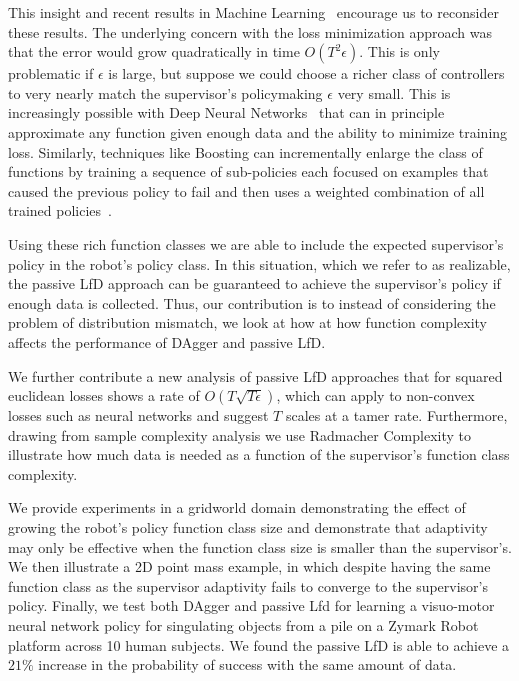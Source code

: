 \documentclass[10pt, conference]{ieeeconf}      %
\begin{document}
This insight and recent results in Machine Learning~\cite{krizhevsky2012imagenet} encourage us to reconsider these results. The underlying concern with the loss minimization approach was that the error would grow quadratically in time $O(T^2\epsilon)$. This is only problematic if $\epsilon$ is large, but suppose we could choose a richer class of controllers to very nearly match the supervisor’s policymaking $\epsilon$ very small. This is increasingly possible with Deep Neural Networks~\cite{anthony2009neural} that can in principle approximate any function given enough data and the ability to minimize training loss. Similarly, techniques like Boosting can incrementally enlarge the class of functions by training a sequence of sub-policies each focused on examples that caused the previous policy to fail and then uses a weighted combination of all trained policies~\cite{mason1999boosting}.

Using these rich function classes we are able to include the expected supervisor's policy in the robot's policy class. In this situation, which we refer to as realizable, the passive LfD approach can be guaranteed to achieve the supervisor's policy if enough data is collected. Thus, our contribution is to instead of considering the problem of distribution mismatch, we look at how at how function complexity affects the performance of DAgger and passive LfD. 

We further contribute a new analysis of passive LfD approaches that for squared euclidean losses shows a rate of $O(T\sqrt{T\epsilon})$, which can apply to non-convex losses such as neural networks and suggest $T$ scales at a tamer rate. Furthermore, drawing from sample complexity analysis we use Radmacher Complexity to illustrate how much data is needed as a function of the supervisor's function class complexity. 


We  provide experiments in a gridworld domain demonstrating the effect of growing the robot's policy function class size and demonstrate that adaptivity may only be effective when the function class size is smaller than the supervisor's. We then illustrate a 2D point mass example, in which despite having the same function class as the supervisor adaptivity fails to converge to the supervisor's policy. Finally, we test both DAgger and passive Lfd for learning a visuo-motor neural network policy for singulating objects from a pile on a Zymark Robot platform across 10 human subjects. We found the passive LfD is able to achieve a $21 \%$ increase in the probability of success with the same amount of data.
\end{document}
